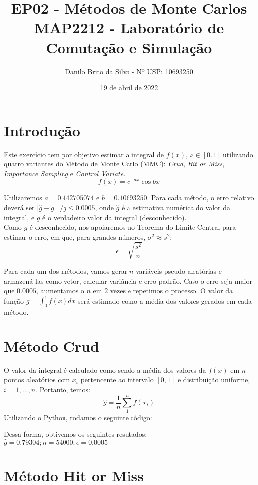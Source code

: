 \documentclass{article}
\title{EP02 - Métodos de Monte Carlos\\
MAP2212 - Laboratório de Comutação e Simulação}
\author{Danilo Brito da Silva - Nº USP: 10693250}
\date{19 de abril de 2022}
\begin{document}
\maketitle

\section{Introdução}


Este exercício tem por objetivo estimar a integral de $f(x)$, $x \in [0.1]$ utilizando quatro variantes do Método de Monte Carlo (MMC): \textit{Crud}, \textit{Hit or Miss}, \textit{Importance Sampling} e \textit{Control Variate}.
\begin{equation}
    f(x) = e^{-a x}\cos{bx}
\end{equation}


Utilizaremos $a=0.442705074$ e $b=0.10693250$. Para cada método, o erro relativo deverá ser $\mid\hat{g} - g\mid/g \leq 0.0005$, onde $\hat{g}$ é a estimativa numérica do valor da integral, e $g$ é o verdadeiro valor da integral (desconhecido). \\
Como $g$ é desconhecido, nos apoiaremos no Teorema do Limite Central para estimar o erro, em que, para grandes
números, $\sigma^2 \approx s^2$:
\begin{equation}
    \epsilon = \sqrt{\dfrac{s^2}{n}}
\end{equation}


Para cada um dos métodos, vamos gerar $n$ variáveis pseudo-aleatórias e armazená-las como vetor, calcular variância e erro padrão. Caso o erro seja maior que $0.0005$, aumentamos o $n$ em $2$ vezes e repetimos o processo. O valor da função $g = \int_{0}^{1}f(x)dx$ será estimado como a média dos valores gerados em cada método.

\section{Método Crud}


O valor da integral é calculado como sendo a média dos valores da $f(x)$ em $n$ pontos aleatórios com $x_i$ pertencente ao intervalo $[0, 1]$ e distribuição uniforme, $i=1,...,n$. Portanto, temos:
$$
\hat{g}=\frac{1}{n}\sum_{1}^{n}f(x_i)
$$
Utilizando o Python, rodamos o seguinte código:

Dessa forma, obtivemos os seguintes resutados:\\
$\hat{g}=0.79304; n = 54000;    \epsilon = 0.0005$

\section{Método Hit or Miss}
\end{document}
